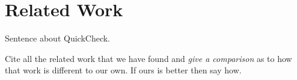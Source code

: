 \clearpage
\section{Related Work}

Sentence about QuickCheck\cite{claessen:quickcheck}. 

Cite all the related work that we have found and \emph{give a comparison} as to how that work is different to our own. If ours is better then say how.
